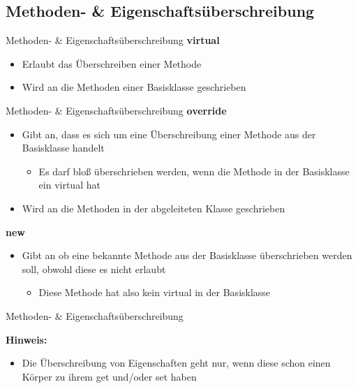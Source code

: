 \subsection{Methoden- \& Eigenschaftsüberschreibung}
\begin{frame}{Methoden- \& Eigenschaftsüberschreibung}	
	\textbf{virtual}\\
	\begin{itemize}
		\item Erlaubt das Überschreiben einer Methode
		\item Wird an die Methoden einer Basisklasse geschrieben
	\end{itemize}
	
\end{frame}

\begin{frame}{Methoden- \& Eigenschaftsüberschreibung}	
	\textbf{override}\\
	\begin{itemize}
		\item Gibt an, dass es sich um eine Überschreibung einer Methode aus der Basisklasse handelt
		\begin{itemize}
			\item Es darf bloß überschrieben werden, wenn die Methode in der Basisklasse ein \alert{virtual} hat
		\end{itemize}
		\item Wird an die Methoden in der abgeleiteten Klasse geschrieben
	\end{itemize}
	\textbf{new}\\
	\begin{itemize}
		\item Gibt an ob eine bekannte Methode aus der Basisklasse überschrieben werden soll, obwohl diese es nicht erlaubt
		\begin{itemize}
			\item Diese Methode hat also kein \alert{virtual} in der Basisklasse
		\end{itemize}
	\end{itemize}
\end{frame}

\begin{frame}{Methoden- \& Eigenschaftsüberschreibung}
		
	\textbf{Hinweis:}
	\begin{itemize}
		\item Die Überschreibung von Eigenschaften geht nur, wenn diese schon einen Körper zu ihrem \alert{get} und/oder \alert{set} haben
	\end{itemize}
\end{frame}


